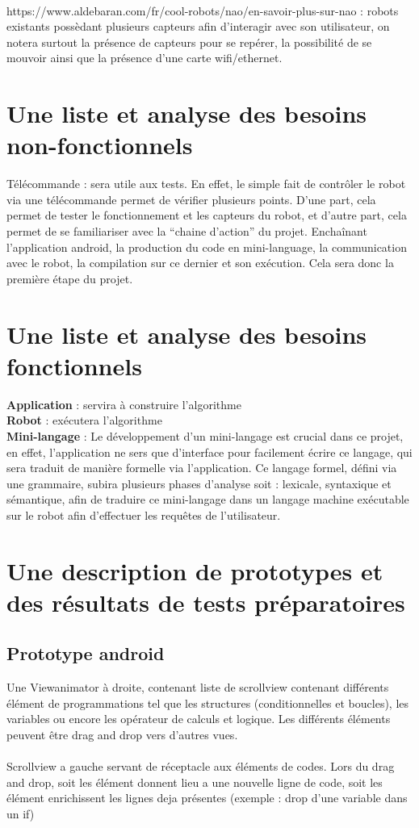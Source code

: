 \documentclass[a4paper]{article}
\begin{document}
\paragraph{}
https://www.aldebaran.com/fr/cool-robots/nao/en-savoir-plus-sur-nao : robots existants possèdant plusieurs capteurs afin d’interagir avec son utilisateur, on notera surtout la présence de capteurs pour se repérer, la possibilité de se mouvoir ainsi que la présence d’une carte wifi/ethernet.

\section{Une liste et analyse des besoins non-fonctionnels}
Télécommande : sera utile aux tests. En effet, le simple fait de contrôler le robot via une télécommande permet de vérifier plusieurs points. D’une part, cela permet de tester le fonctionnement et les capteurs du robot, et d’autre part, cela permet de se familiariser avec la “chaine d’action” du projet. Enchaînant l’application android, la production du code en mini-language, la communication avec le robot, la compilation sur ce dernier et son exécution. Cela sera donc la première étape du projet.
\section{Une liste et analyse des besoins fonctionnels}
\textbf{Application} : servira à construire l’algorithme\\
\textbf{Robot} : exécutera l’algorithme\\
\textbf{Mini-langage }: Le développement d’un mini-langage est crucial dans ce projet, en effet, l’application ne sers que d’interface pour facilement écrire ce langage, qui sera traduit de manière formelle via l’application. Ce langage formel, défini via une grammaire, subira plusieurs phases d’analyse soit : lexicale, syntaxique et sémantique, afin de traduire ce mini-langage dans un langage machine exécutable sur le robot afin d’effectuer les requêtes de l’utilisateur.
\section{Une description de prototypes et des résultats de tests préparatoires}
\subsection{Prototype android}
Une Viewanimator à droite, contenant liste de scrollview contenant différents élément de programmations tel que les structures (conditionnelles et boucles), les variables ou encore les opérateur de calculs et logique. Les différents éléments peuvent être drag and drop vers d’autres vues. \\
\\
Scrollview a gauche servant de réceptacle aux éléments de codes. Lors du drag and drop, soit les élément donnent lieu a une nouvelle ligne de code, soit les élément enrichissent les lignes deja présentes (exemple : drop d’une variable dans un if)
\end{document}
